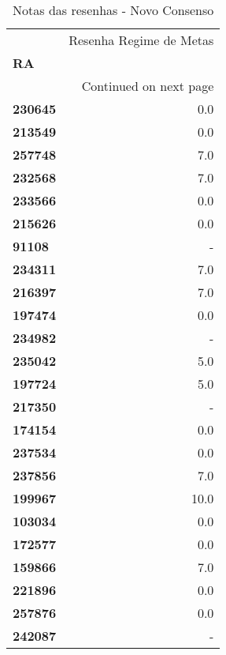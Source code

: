 \documentclass[11pt]{article}
\begin{document}
\begin{center}
\begin{longtable}{lr}
\caption{Notas das resenhas - Novo Consenso}\\
\toprule
{} &  Resenha Regime de Metas \\
\textbf{RA    } &                          \\
\midrule
\endhead
\midrule
\multicolumn{2}{r}{{Continued on next page}} \\
\midrule
\endfoot

\bottomrule
\endlastfoot
\textbf{230645} &                      0.0 \\
\textbf{213549} &                      0.0 \\
\textbf{257748} &                      7.0 \\
\textbf{232568} &                      7.0 \\
\textbf{233566} &                      0.0 \\
\textbf{215626} &                      0.0 \\
\textbf{91108 } &                        - \\
\textbf{234311} &                      7.0 \\
\textbf{216397} &                      7.0 \\
\textbf{197474} &                      0.0 \\
\textbf{234982} &                        - \\
\textbf{235042} &                      5.0 \\
\textbf{197724} &                      5.0 \\
\textbf{217350} &                        - \\
\textbf{174154} &                      0.0 \\
\textbf{237534} &                      0.0 \\
\textbf{237856} &                      7.0 \\
\textbf{199967} &                     10.0 \\
\textbf{103034} &                      0.0 \\
\textbf{172577} &                      0.0 \\
\textbf{159866} &                      7.0 \\
\textbf{221896} &                      0.0 \\
\textbf{257876} &                      0.0 \\
\textbf{242087} &                        - \\

\end{longtable}
\end{center}
\end{document}
